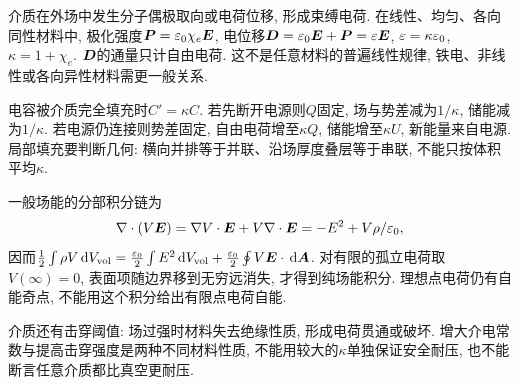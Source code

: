 介质在外场中发生分子偶极取向或电荷位移, 形成束缚电荷. 在线性、均匀、各向同性材料中, 极化强度$\boldsymbol{P}=\varepsilon_0\chi_e\boldsymbol{E}$, 电位移$\boldsymbol{D}=\varepsilon_0\boldsymbol{E}+\boldsymbol{P}=\varepsilon\boldsymbol{E}$, $\varepsilon=\kappa\varepsilon_0$, $\kappa=1+\chi_e$. $\boldsymbol{D}$的通量只计自由电荷. 这不是任意材料的普遍线性规律, 铁电、非线性或各向异性材料需更一般关系.

电容被介质完全填充时$C'=\kappa C$. 若先断开电源则$Q$固定, 场与势差减为$1/\kappa$, 储能减为$1/\kappa$. 若电源仍连接则势差固定, 自由电荷增至$\kappa Q$, 储能增至$\kappa U$, 新能量来自电源. 局部填充要判断几何: 横向并排等于并联、沿场厚度叠层等于串联, 不能只按体积平均$\kappa$.


一般场能的分部积分链为
\[
\nabla\cdot(V\boldsymbol{E})=\nabla V\cdot\boldsymbol{E}+V\nabla\cdot\boldsymbol{E}=-E^2+V\rho/\varepsilon_0,
\]
因而$\tfrac12\int\rho V\,\mathrm d V_{\rm vol}=\tfrac{\varepsilon_0}2\int E^2\,\mathrm d V_{\rm vol}+\tfrac{\varepsilon_0}2\oint V\boldsymbol{E}\cdot\,\mathrm d\boldsymbol{A}$. 对有限的孤立电荷取$V(\infty)=0$, 表面项随边界移到无穷远消失, 才得到纯场能积分. 理想点电荷仍有自能奇点, 不能用这个积分给出有限点电荷自能.

介质还有击穿阈值: 场过强时材料失去绝缘性质, 形成电荷贯通或破坏. 增大介电常数与提高击穿强度是两种不同材料性质, 不能用较大的$\kappa$单独保证安全耐压, 也不能断言任意介质都比真空更耐压.
